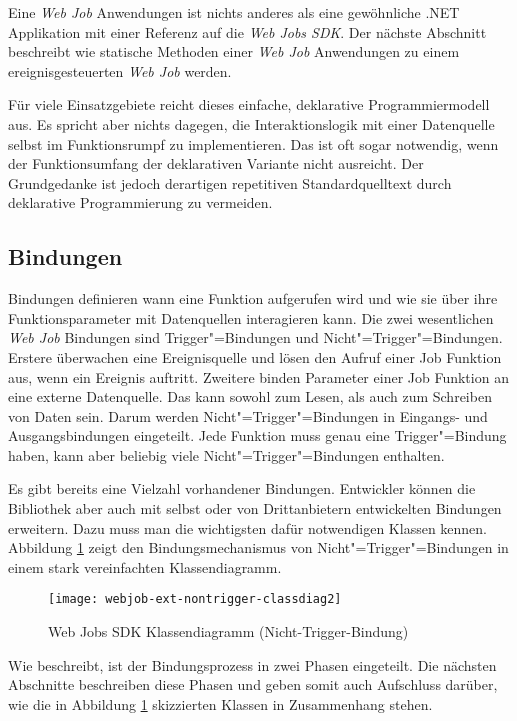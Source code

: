 Eine \textit{Web Job} Anwendungen ist nichts anderes als eine gewöhnliche .NET Applikation mit einer Referenz auf die \textit{Web Jobs SDK}. Der nächste Abschnitt beschreibt wie statische Methoden einer \textit{Web Job} Anwendungen zu einem ereignisgesteuerten \textit{Web Job} werden.

Für viele Einsatzgebiete reicht dieses einfache, deklarative Programmiermodell aus. Es spricht aber nichts dagegen, die Interaktionslogik mit einer Datenquelle selbst im Funktionsrumpf zu implementieren. Das ist oft sogar notwendig, wenn der Funktionsumfang der deklarativen Variante nicht ausreicht. Der Grundgedanke ist jedoch derartigen repetitiven Standardquelltext durch deklarative Programmierung zu vermeiden.

\subsection{Bindungen}

Bindungen definieren wann eine Funktion aufgerufen wird und wie sie über ihre Funktionsparameter mit Datenquellen interagieren kann. Die zwei wesentlichen \textit{Web Job} Bindungen sind Trigger"=Bindungen und Nicht"=Trigger"=Bindungen. Erstere überwachen eine Ereignisquelle und lösen den Aufruf einer Job Funktion aus, wenn ein Ereignis auftritt. Zweitere binden Parameter einer Job Funktion an eine externe Datenquelle. Das kann sowohl zum Lesen, als auch zum Schreiben von Daten sein. Darum werden Nicht"=Trigger"=Bindungen in Eingangs- und Ausgangsbindungen eingeteilt. Jede Funktion muss genau eine Trigger"=Bindung haben, kann aber beliebig viele Nicht"=Trigger"=Bindungen enthalten.

Es gibt bereits eine Vielzahl vorhandener Bindungen. Entwickler können die Bibliothek aber auch mit selbst oder von Drittanbietern entwickelten Bindungen erweitern. Dazu muss man die wichtigsten dafür notwendigen Klassen kennen. Abbildung \ref{fig:webjobsclassdiag} zeigt den Bindungsmechanismus von Nicht"=Trigger"=Bindungen in einem stark vereinfachten Klassendiagramm.

\begin{figure}[!hbt]%
\texttt{[image: webjob-ext-nontrigger-classdiag2]}%
\caption{Web Jobs SDK Klassendiagramm (Nicht-Trigger-Bindung)}%
\label{fig:webjobsclassdiag}%
\end{figure}

Wie \cite{WebJobsSdkBindingProcess} beschreibt, ist der Bindungsprozess in zwei Phasen eingeteilt. Die nächsten Abschnitte beschreiben diese Phasen und geben somit auch Aufschluss darüber, wie die in Abbildung \ref{fig:webjobsclassdiag} skizzierten Klassen in Zusammenhang stehen.


